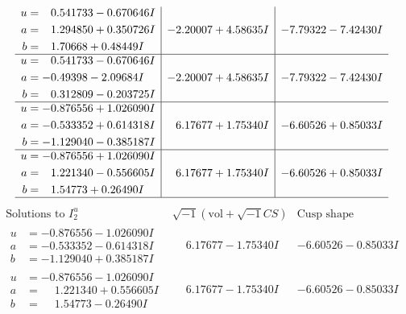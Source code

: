 \documentclass[1p]{elsarticle_modified}
\theoremstyle{definition}
\newcommand{\I}{\sqrt{-1}}
\begin{document}
$$\begin{array}{c|c|c}
\begin{aligned}
u &= \phantom{-}0.541733 - 0.670646 I \\
a &= \phantom{-}1.294850 + 0.350726 I \\
b &= \phantom{-}1.70668 + 0.48449 I\end{aligned}
 & -2.20007 + 4.58635 I & -7.79322 - 7.42430 I \\ \hline\begin{aligned}
u &= \phantom{-}0.541733 - 0.670646 I \\
a &= -0.49398 - 2.09684 I \\
b &= \phantom{-}0.312809 - 0.203725 I\end{aligned}
 & -2.20007 + 4.58635 I & -7.79322 - 7.42430 I \\ \hline\begin{aligned}
u &= -0.876556 + 1.026090 I \\
a &= -0.533352 + 0.614318 I \\
b &= -1.129040 - 0.385187 I\end{aligned}
 & \phantom{-}6.17677 + 1.75340 I & -6.60526 + 0.85033 I \\ \hline\begin{aligned}
u &= -0.876556 + 1.026090 I \\
a &= \phantom{-}1.221340 - 0.556605 I \\
b &= \phantom{-}1.54773 + 0.26490 I\end{aligned}
 & \phantom{-}6.17677 + 1.75340 I & -6.60526 + 0.85033 I\\
 \hline 
 \end{array}$$\newpage$$\begin{array}{c|c|c}  
\text{Solutions to }I^u_{2}& \I (\text{vol} + \sqrt{-1}CS) & \text{Cusp shape}\\
 \hline 
\begin{aligned}
u &= -0.876556 - 1.026090 I \\
a &= -0.533352 - 0.614318 I \\
b &= -1.129040 + 0.385187 I\end{aligned}
 & \phantom{-}6.17677 - 1.75340 I & -6.60526 - 0.85033 I \\ \hline\begin{aligned}
u &= -0.876556 - 1.026090 I \\
a &= \phantom{-}1.221340 + 0.556605 I \\
b &= \phantom{-}1.54773 - 0.26490 I\end{aligned}
 & \phantom{-}6.17677 - 1.75340 I & -6.60526 - 0.85033 I \\ \hline\begin{aligned}

\end{aligned}
\end{array}$$
\end{document}

